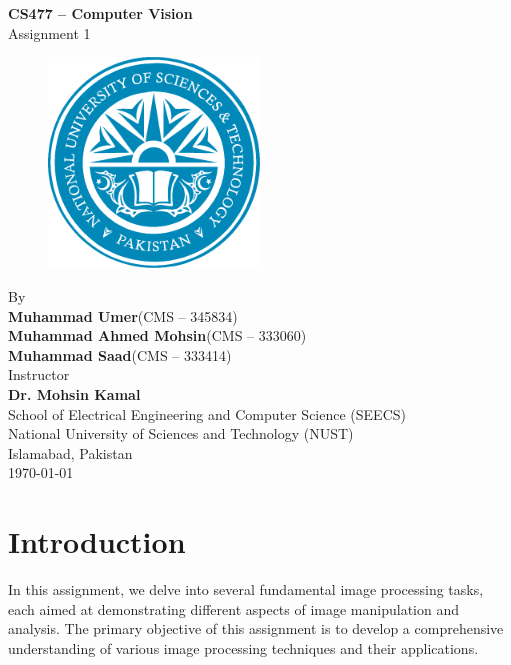 \documentclass[11pt,a4paper]{article}
\begin{document}
\newpage
\begin{titlepage}
    \vspace*{\fill} %
    \centering
    \huge{\textbf{CS477 -- Computer Vision}} \\
    \huge{Assignment 1} \\ [0.75cm]
    \begin{figure}[ht!]
        \centering
        \includegraphics[width=0.5\textwidth]{figs/nust.pdf}
    \end{figure}
    \vspace {0.75cm}
    \Large{By} \\
    \Large{\textbf{Muhammad Umer}\quad(CMS -- 345834)} \\
    \Large{\textbf{Muhammad Ahmed Mohsin}\quad(CMS -- 333060)} \\
    \Large{\textbf{Muhammad Saad}\quad(CMS -- 333414)} \\ [0.75cm]
    \Large{Instructor} \\
    \Large{\textbf{Dr. Mohsin Kamal}} \\[0.75cm]
    \Large{School of Electrical Engineering and Computer Science (SEECS) \\
        National University of Sciences and Technology (NUST) \\
        Islamabad, Pakistan} \\ [0.75 cm]
    \Large{\today}
    \vspace*{\fill} %
\end{titlepage}

\tableofcontents

\newpage
\setcounter{page}{1}
\section{Introduction}

In this assignment, we delve into several fundamental image processing tasks, each aimed at demonstrating different aspects of image manipulation and analysis. The primary objective of this assignment is to develop a comprehensive understanding of various image processing techniques and their applications.
\end{document}
